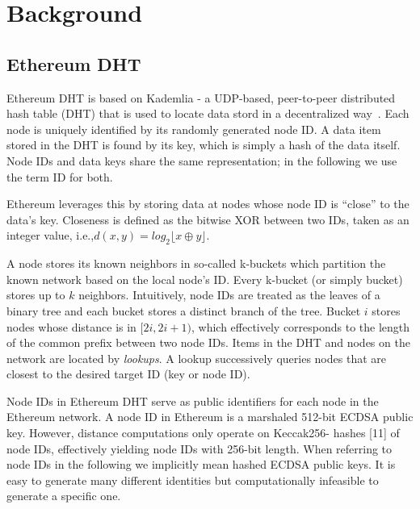 
\section{Background}
\label{sec:background}


\subsection{Ethereum DHT}
Ethereum DHT is based on Kademlia - a UDP-based, peer-to-peer distributed hash table (DHT) that is used to locate data stord in a decentralized way~\cite{maymounkov2002kademlia}. Each node is uniquely identified by its randomly generated node ID. A data item stored in the DHT is found by its key, which is simply a hash of the data itself. Node IDs and data keys share the same representation; in the following we use the term ID for both.

Ethereum leverages this by storing data at nodes whose node ID is “close” to the data’s key. Closeness is defined as the bitwise XOR between two IDs, taken as an integer value, i.e.,$d(x, y) = \textit{log}_2 \lfloor x \oplus y \rfloor$.


A node stores its known neighbors in so-called k-buckets which partition the known network based on the local node’s ID. Every k-bucket (or simply bucket) stores up to $k$ neighbors. Intuitively, node IDs are treated as the leaves of a binary tree and each bucket stores a distinct branch of the tree. Bucket $i$ stores nodes whose distance is in $[2i, 2i+1)$, which effectively corresponds to the length of the common prefix between two node IDs. Items in the DHT and nodes on the network are located by \emph{lookups}. A lookup successively queries nodes that are closest to the desired target ID (key or node ID).

Node IDs in Ethereum DHT serve as public identifiers for each node in the Ethereum network. A node ID in Ethereum is a marshaled 512-bit ECDSA public key. However, distance computations only operate on Keccak256- hashes [11] of node IDs, effectively yielding node IDs with 256-bit length. When referring to node IDs in the following we implicitly mean hashed ECDSA public keys. It is easy to generate many different identities but computationally infeasible to generate a specific one.
